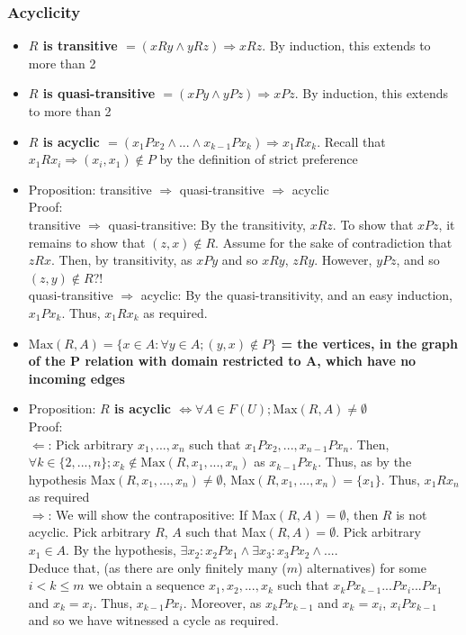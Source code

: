 \documentclass[20pt,a4paper,landscape]{extarticle}
\begin{document}
\begin{flushleft}
\subsubsection{Acyclicity}
\begin{itemize}
\item{\textbf{$R$ is transitive $= (xRy \land yRz) \Rightarrow xRz$}. By induction, this extends to more than 2}
\item{\textbf{$R$ is quasi-transitive $= (xPy \land yPz) \Rightarrow xPz$}. By induction, this extends to more than 2}
\item{\textbf{$R$ is acyclic $= (x_1Px_2 \land ... \land x_{k - 1}Px_k) \Rightarrow x_1Rx_k$}. Recall that $x_1Rx_i \Rightarrow (x_i, x_1) \notin P$ by the definition of strict preference}
\item Proposition: transitive $\Rightarrow$ quasi-transitive $\Rightarrow$ acyclic\\
Proof:\\
transitive $\Rightarrow$ quasi-transitive: By the transitivity, $xRz$. To show that $xPz$, it remains to show that $(z, x) \notin R$. Assume for the sake of contradiction that $zRx$. Then, by transitivity, as $xPy$ and so $xRy$, $zRy$. However, $yPz$, and so $(z, y) \notin R$?!\\
quasi-transitive $\Rightarrow$ acyclic: By the quasi-transitivity, and an easy induction, $x_1Px_k$. Thus, $x_1Rx_k$ as required.
\item{\textbf{$\textrm{Max}(R, A) = \{x \in A: \forall y \in A; (y, x) \notin P\}$ = the vertices, in the graph of the P relation with domain restricted to A, which have no incoming edges}}
\item Proposition: \textbf{$R$ is acyclic $\Leftrightarrow \forall A \in F(U); \textrm{Max}(R, A) \neq \emptyset$}\\
Proof:\\
$\Leftarrow$: Pick arbitrary $x_1, ..., x_n$ such that $x_1Px_2, ..., x_{n - 1}Px_n$. Then, $\forall k \in \{2, ..., n\}; x_k \notin \textrm{Max}(R, {x_1, ..., x_n})$ as $x_{k-1}Px_k$. Thus, as by the hypothesis Max$(R, {x_1, ..., x_n}) \neq \emptyset$, Max$(R, {x_1, ..., x_n}) = \{x_1\}$. Thus, $x_1Rx_n$ as required\\
$\Rightarrow$: We will show the contrapositive: If Max$(R, A) = \emptyset$, then $R$ is not acyclic. Pick arbitrary $R$, $A$ such that Max$(R, A) = \emptyset$. Pick arbitrary $x_1 \in A$. By the hypothesis, $\exists x_2: x_2Px_1 \land \exists x_3: x_3Px_2 \land ...$.\\
Deduce that, (as there are only finitely many ($m$) alternatives) for some $i < k \leq m$ we obtain a sequence $x_1, x_2, ..., x_k$ such that $x_kPx_{k-1}...Px_i...Px_1$ and $x_k=x_i$. Thus, $x_{k-1}P{x_i}$. Moreover, as $x_kPx_{k-1}$ and $x_k=x_i$, $x_iPx_{k-1}$ and so we have witnessed a cycle as required.
\end{itemize}
\clearpage

\end{flushleft}
\end{document}
